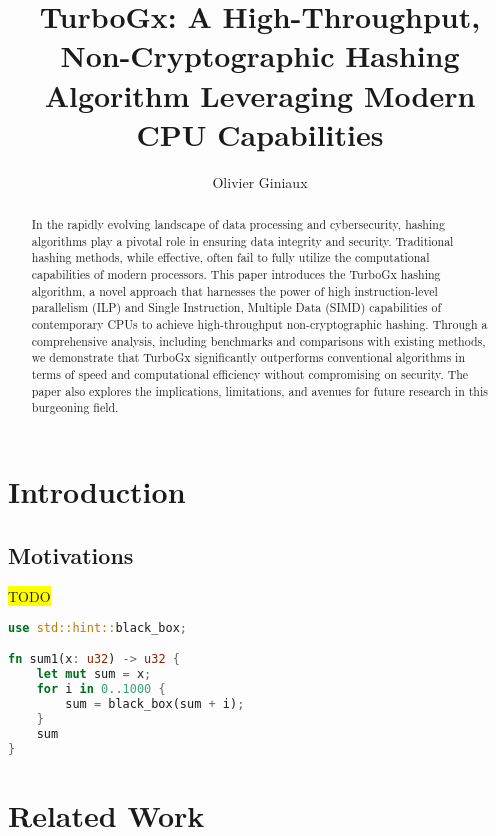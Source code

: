 \documentclass[11pt]{article}
\title{TurboGx: A High-Throughput, Non-Cryptographic Hashing Algorithm Leveraging Modern CPU Capabilities}
\author{Olivier Giniaux}
\date{}
\begin{document}
\maketitle

\begin{abstract}

In the rapidly evolving landscape of data processing and cybersecurity, hashing algorithms play a pivotal role in ensuring data integrity and security. Traditional hashing methods, while effective, often fail to fully utilize the computational capabilities of modern processors. This paper introduces the TurboGx hashing algorithm, a novel approach that harnesses the power of high instruction-level parallelism (ILP) and Single Instruction, Multiple Data (SIMD) capabilities of contemporary CPUs to achieve high-throughput non-cryptographic hashing. Through a comprehensive analysis, including benchmarks and comparisons with existing methods, we demonstrate that TurboGx significantly outperforms conventional algorithms in terms of speed and computational efficiency without compromising on security. The paper also explores the implications, limitations, and avenues for future research in this burgeoning field.

\end{abstract}

\begin{multicols}{2}
\tableofcontents
\end{multicols}

\clearpage
\section{Introduction}

\subsection{Motivations}

\colorbox{yellow}{TODO}

\begin{lstlisting}[language=Rust, style=boxed]
use std::hint::black_box;

fn sum1(x: u32) -> u32 {
    let mut sum = x;
    for i in 0..1000 {
        sum = black_box(sum + i);
    }
    sum
}
\end{lstlisting}

\section{Related Work}
\end{document}
